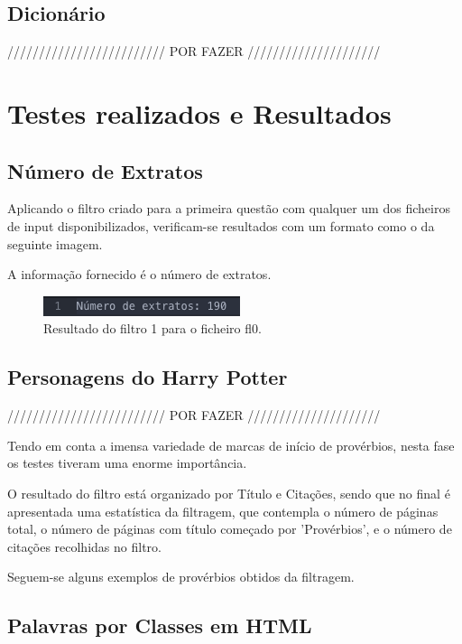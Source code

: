 \documentclass[11pt,a4paper]{report}
\begin{document}
\subsection{Dicionário}

///////////////////////// POR FAZER /////////////////////


\section{Testes realizados e Resultados}
\subsection{Número de Extratos}

Aplicando o filtro criado para a primeira questão com qualquer um dos ficheiros de input disponibilizados, verificam-se resultados com um formato como o da seguinte imagem.

A informação fornecido é o número de extratos.

\begin{figure}[H]
\centering
\includegraphics[scale=0.7]{testes1.png}
\caption{Resultado do filtro 1 para o ficheiro fl0.}
\label{img:testes1}
\end{figure}


\subsection{Personagens do Harry Potter}

///////////////////////// POR FAZER /////////////////////

Tendo em conta a imensa variedade de marcas de início de provérbios, nesta fase os testes tiveram uma enorme importância.

O resultado do filtro está organizado por Título e Citações, sendo que no final é apresentada uma estatística da filtragem, que contempla o número de páginas total, o número de páginas com título começado por 'Provérbios', e o número de citações recolhidas no filtro.

Seguem-se alguns exemplos de provérbios obtidos da filtragem.


\newpage

\subsection{Palavras por Classes em HTML}
\end{document}

